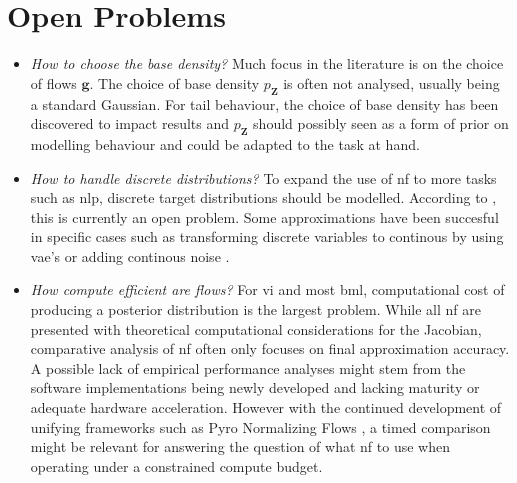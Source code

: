 \documentclass[12pt,fleqn,twocolumn]{article}
\begin{document}
\section*{Open Problems}%
\label{sec:Open Problems}
\begin{itemize}
    \item \emph{How to choose the base density?}
        Much focus in the literature is on the choice of flows $\mathbf g$.
        The choice of base density $p_\mathbf Z$ is often not analysed, usually being a standard Gaussian.
        For tail behaviour, the choice of base density has been discovered to impact results \cite{Jaini2019TailsOT} and $p_\mathbf Z$ should possibly seen as a form of prior on modelling behaviour \cite[Chap. 5.1.1]{koby2021nf} and could be adapted to the task at hand.
    \item \emph{How to handle discrete distributions?}
        To expand the use of \acrshort{nf} to more tasks such as \acrfull{nlp}, discrete target distributions should be modelled.
        According to \textcite{koby2021nf}, this is currently an open problem. 
        Some approximations have been succesful in specific cases such as transforming discrete variables to continous by using \acrshort{vae}'s or adding continous noise \cite[Chap. 5.2.2]{koby2021nf}.
    \item \emph{How compute efficient are flows?}
        For \acrshort{vi} and most \acrshort{bml}, computational cost of producing a posterior distribution is the largest problem.
        While all \acrshort{nf} are presented with theoretical computational considerations for the Jacobian, comparative analysis of \acrshort{nf} often only focuses on final approximation accuracy.
        A possible lack of empirical performance analyses might stem from the software implementations being newly developed and lacking maturity or adequate hardware acceleration.
        However with the continued development of unifying frameworks such as Pyro Normalizing Flows \cite{bingham2018pyro}, a timed comparison might be relevant for answering the question of what \acrshort{nf} to use when operating under a constrained compute budget.
\end{itemize}

\clearpage
\renewcommand*{\bibfont}{\normalfont\footnotesize}
\printbibliography[heading=bibintoc]

\printglossary[type=\acronymtype]
\end{document}
